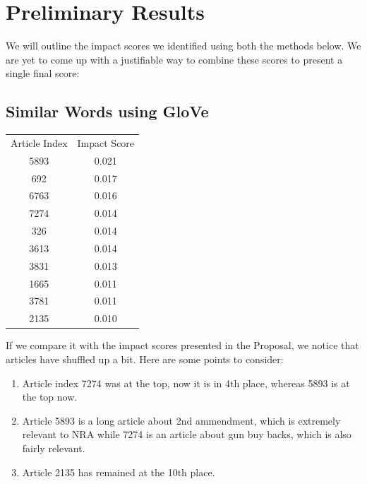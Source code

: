 \documentclass{article}
\begin{document}
 \maketitle
\section{Preliminary Results} %
We will outline the impact scores we identified using both the methods below. We are yet to come up with a justifiable way to combine these scores to present a single final score:

\subsection {Similar Words using GloVe}
	\begin{center}
		\begin{tabular}{ c c }
			Article Index & Impact Score \\
			5893 & 0.021 \\ 
			692 & 0.017 \\  
			6763 & 0.016 \\ 
			7274 & 0.014\\ 
			326 & 0.014 \\  
			3613 & 0.014 \\ 
			3831 & 0.013 \\ 
			1665 & 0.011 \\  
			3781 & 0.011 \\ 
			2135 & 0.010 \\ 
		\end{tabular}
	\end{center}

If we compare it with the impact scores presented in the Proposal, we notice that articles have shuffled up a bit. Here are some points to consider:
\begin {enumerate}
\item Article index 7274 was at the top, now it is in 4th place, whereas 5893 is at the top now.
\item Article 5893 is a long article about 2nd ammendment, which is extremely relevant to NRA while 7274 is an article about gun buy backs, which is also fairly relevant. 
\item Article 2135 has remained at the 10th place.
\end {enumerate}
\end{document}
